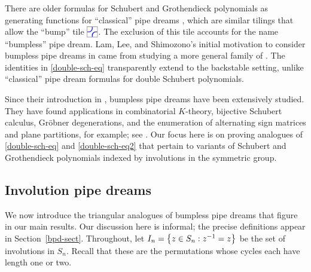\documentclass[10pt]{article}
\begin{document}
There are older formulas for Schubert and Grothendieck polynomials
as generating functions for ``classical'' pipe dreams
\cite{BergeronBilley, fomin1994grothendieck,KnutsonMiller},
which are similar tilings that allow the ``bump'' tile $\ETILE$.
The exclusion of this tile accounts for the name ``bumpless'' pipe dream.
Lam, Lee, and Shimozono's initial motivation to consider bumpless pipe dreams in \cite{LLS} came from studying a more general family of  .
The identities in \eqref{double-sch-eq} transparently extend
to the backstable setting, unlike ``classical'' pipe dream formulas for double Schubert polynomials.


Since their introduction in \cite{LLS},
bumpless pipe dreams have been extensively studied.
They have found applications in combinatorial $K$-theory, bijective Schubert calculus, Gr\"obner degenerations, and the enumeration of alternating sign matrices and plane partitions, for example; see \cite{GaoHuang,HPW,Huang2023,HuangStriker2024,KleinWeigandt,Weigandt}.
Our focus here is on proving analogues of 
\eqref{double-sch-eq} and \eqref{double-sch-eq2}
that pertain to variants of Schubert and Grothendieck polynomials indexed by involutions in the symmetric group.

\subsection{Involution pipe dreams}

We now introduce the triangular analogues
of bumpless pipe dreams that figure in our main results.
Our discussion here is informal; the precise definitions appear in Section~\ref{bpd-sect}.
Throughout, let $I_n = \left\{z \in S_n : z^{-1}=z\right\}$ be the set of involutions in $S_n$. Recall that these are the permutations
whose cycles each have length one or two.
\end{document}
